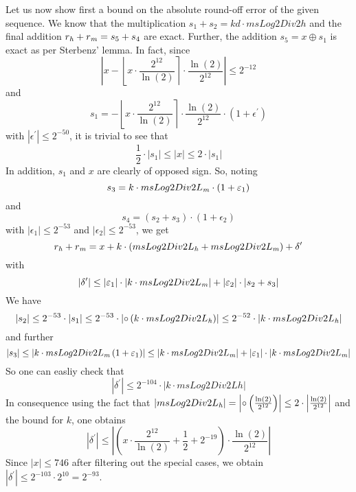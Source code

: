 Let us now show first a bound on the absolute round-off error of the
given sequence.  We know that the multiplication $s_1 + s_2 = kd \cdot
msLog2Div2h$ and the final addition $r_{\mathit{h}} + r_{\mathit{m}} = s_5 + s_4$ are
exact. Further, the addition $s_5 = x \oplus s_1$ is exact as per Sterbenz' lemma.
In fact, since 
$$\left \vert x - \left \lfloor x \cdot
\frac{2^{12}}{\ln\left(2\right)} \right \rceil \cdot
\frac{\ln\left(2\right)}{2^{12}} \right \vert \leq 2^{-12}$$ and
$$s_1 = - \left \lfloor x \cdot \frac{2^{12}}{\ln\left(2\right)}
\right \rceil \cdot \frac{\ln\left(2\right)}{2^{12}} \cdot \left( 1 + \epsilon^\prime \right)$$
with $\left \vert \epsilon^\prime \right \vert \leq 2^{-50}$, it is trivial to see that
$$\frac{1}{2} \cdot \left \vert s_1 \right \vert \leq \left \vert x
\right \vert \leq 2 \cdot \left \vert s_1 \right \vert$$ In addition,
$s_1$ and $x$ are clearly of opposed sign. So, noting
$$s_3 = k \cdot msLog2Div2L_{\mathit{m}} \cdot \left( 1 + \varepsilon_1 \right)$$ and
$$s_4 = \left( s_2 + s_3 \right) \cdot \left( 1 + \epsilon_2 \right)$$
with $\left \vert \epsilon_1 \right \vert \leq 2^{-53}$ and $\left
\vert \epsilon_2 \right \vert \leq 2^{-53}$, we get
$$r_{\mathit{h}} + r_{\mathit{m}} = x + k \cdot \left( msLog2Div2L_{\mathit{h}} + msLog2Div2L_{\mathit{m}} \right) + \delta^\prime$$
with 
$$\left \vert \delta^\prime \right \vert \leq \left \vert \varepsilon_1 \right
\vert \cdot \left \vert k \cdot msLog2Div2L_{\mathit{m}} \right \vert + \left
\vert \varepsilon_2 \right \vert \cdot \left \vert s_2 + s_3 \right
\vert$$
We have
$$\left \vert s_2 \right \vert \leq 2^{-53} \cdot \left \vert s_1
\right \vert \leq 2^{-53} \cdot \left \vert \circ \left( k \cdot
msLog2Div2L_{\mathit{h}} \right) \right \vert \leq 2^{-52} \cdot \left \vert k
\cdot msLog2Div2L_{\mathit{h}} \right \vert$$
and further
$$\left \vert s_3 \right \vert \leq \left \vert k \cdot msLog2Div2L_{\mathit{m}} \left( 1 + \varepsilon_1 \right) \right \vert
\leq \left \vert k \cdot msLog2Div2L_{\mathit{m}} \right \vert + \left \vert \varepsilon_1 \right \vert \cdot
\left \vert k \cdot msLog2Div2L_{\mathit{m}} \right \vert$$
So one can easliy check that 
$$\left \vert \delta^\prime \right \vert \leq 2^{-104} \cdot \left
\vert k \cdot msLog2Div2Lh \right \vert$$ In consequence using the
fact that $\left \vert msLog2Div2L_{\mathit{h}} \right \vert = \left \vert \circ
\left( \frac{\ln\left( 2 \right)}{2^{12}} \right) \right \vert \leq 2
\cdot \left \vert \frac{\ln\left( 2 \right)}{2^{12}} \right \vert$ and
the bound for $k$, one obtains
$$\left \vert \delta^\prime \right \vert \leq \left \vert \left( x
\cdot \frac{2^{12}}{\ln\left( 2 \right)} + \frac{1}{2} + 2^{-19}
\right) \cdot \frac{\ln\left( 2 \right)}{2^{12}} \right \vert$$ Since
$\left \vert x \right \vert \leq 746$ after filtering out the special
cases, we obtain $\left \vert \delta^\prime \right \vert \leq 2^{-103}
\cdot 2^{10} = 2^{-93}$.  

